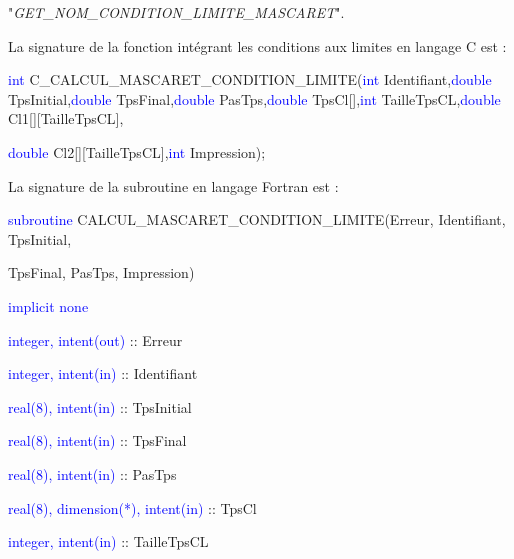 \documentclass[a4paper,11pt]{article}
\begin{document}
 "\textit{GET\_NOM\_CONDITION\_LIMITE\_MASCARET}".
 
 \vspace{0.5cm}
 
 La signature de la fonction int\'egrant les conditions aux limites en langage C est :
 
 \vspace{0.5cm}
 
 \textcolor{blue}{int} C\_CALCUL\_MASCARET\_CONDITION\_LIMITE(\textcolor{blue}{int} Identifiant,\textcolor{blue}{double} TpsInitial,\textcolor{blue}{double} TpsFinal,\textcolor{blue}{double} PasTps,\textcolor{blue}{double} TpsCl[],\textcolor{blue}{int} TailleTpsCL,\textcolor{blue}{double} Cl1[][TailleTpsCL],
 
 \textcolor{blue}{double} Cl2[][TailleTpsCL],\textcolor{blue}{int} Impression);
 
 \vspace{0.5cm} 
 
 La signature de la subroutine en langage Fortran est :
 
 \vspace{0.5cm}
 
    \textcolor{blue}{subroutine} CALCUL\_MASCARET\_CONDITION\_LIMITE(Erreur, Identifiant, TpsInitial,
    
     TpsFinal, PasTps, Impression)
    
        \hspace{1cm}\textcolor{blue}{implicit none}                 
        
        \hspace{1cm} \textcolor{blue}{integer, intent(out)} :: Erreur
        
        \hspace{1cm} \textcolor{blue}{integer, intent(in)}  :: Identifiant
        
        \hspace{1cm} \textcolor{blue}{real(8), intent(in)}  :: TpsInitial
        
        \hspace{1cm} \textcolor{blue}{real(8), intent(in)}  :: TpsFinal
        
        \hspace{1cm} \textcolor{blue}{real(8), intent(in)}  :: PasTps
        
        \hspace{1cm} \textcolor{blue}{real(8), dimension(*), intent(in)}  :: TpsCl
        
        \hspace{1cm} \textcolor{blue}{integer, intent(in)}  :: TailleTpsCL
        
\end{document}

